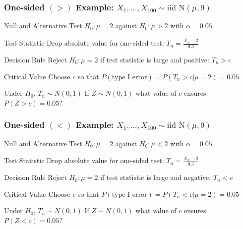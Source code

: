 \begin{frame}
  \frametitle{One-sided $(>)$ Example: $X_1, \dots, X_{100} \sim \mbox{iid N}(\mu,9)$}
  \begin{block}{Null and Alternative}
  Test $H_0\colon \mu =2$ against $H_0\colon \mu >2$ with $\alpha = 0.05$. 
  \end{block}

  \pause

  \begin{block}{Test Statistic}
    Drop absolute value for one-sided test: $\displaystyle T_n = \frac{\bar{X}_n - 2}{0.3}$ 
  \end{block}

  \pause

  \begin{block}{Decision Rule}
    Reject $H_0\colon \mu =2$ if test statistic is \alert{large and positive}: $T_n > c$ 
  \end{block}

  \pause

  \begin{block}{Critical Value}
    Choose $c$ so that $P(\mbox{type I error}) = P(T_n > c|\mu =2) = 0.05$ 
  \end{block}

  \pause

  \begin{block}{Under $H_0$, $T_n \sim N(0,1)$}
   If $Z\sim N(0,1)$ what value of $c$ ensures $P(Z>c) = 0.05$? 
  \end{block}
\end{frame}
\begin{frame}
  \frametitle{One-sided $(<)$ Example: $X_1, \dots, X_{100} \sim \mbox{iid N}(\mu,9)$}
  \begin{block}{Null and Alternative}
  Test $H_0\colon \mu =2$ against $H_0\colon \mu <2$ with $\alpha = 0.05$. 
  \end{block}

  \pause

  \begin{block}{Test Statistic}
    Drop absolute value for one-sided test: $\displaystyle T_n = \frac{\bar{X}_n - 2}{0.3}$ 
  \end{block}

  \pause

  \begin{block}{Decision Rule}
    Reject $H_0\colon \mu =2$ if test statistic is \alert{large and negative}: $T_n < c$ 
  \end{block}

  \pause

  \begin{block}{Critical Value}
    Choose $c$ so that $P(\mbox{type I error}) = P(T_n < c|\mu =2) = 0.05$ 
  \end{block}

  \pause

  \begin{block}{Under $H_0$, $T_n \sim N(0,1)$}
   If $Z\sim N(0,1)$ what value of $c$ ensures $P(Z<c) = 0.05$? 
  \end{block}
\end{frame}
